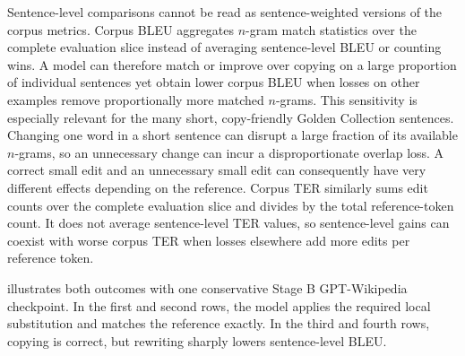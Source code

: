 Sentence-level comparisons cannot be read as sentence-weighted versions of the
corpus metrics. Corpus BLEU aggregates \(n\)-gram match statistics over the complete
evaluation slice instead of averaging sentence-level BLEU or counting wins. A
model can therefore match or improve over copying on a large proportion of
individual sentences yet obtain lower corpus BLEU when losses on other examples remove
proportionally more matched \(n\)-grams. This sensitivity is especially relevant
for the many short, copy-friendly Golden Collection sentences. Changing one word
in a short sentence can disrupt a large fraction of its available \(n\)-grams,
so an unnecessary change can incur a disproportionate overlap loss. A correct
small edit and an unnecessary small edit can consequently have very different
effects depending on the reference. Corpus TER similarly sums edit counts over
the complete evaluation slice and divides by the total reference-token count. It
does not average sentence-level TER values, so sentence-level gains
can coexist with worse corpus TER when losses elsewhere add more edits
per reference token.

 illustrates both outcomes with one
conservative Stage B GPT-Wikipedia checkpoint. In the first and second rows, the
model applies the required local substitution and matches the reference exactly.
In the third and fourth rows, copying is correct, but rewriting sharply lowers
sentence-level BLEU.

